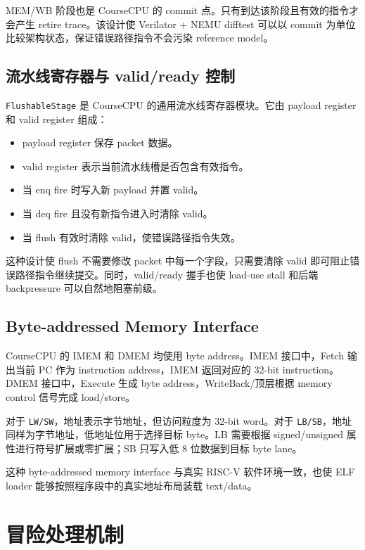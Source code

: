 \documentclass[UTF8,a4paper,12pt]{ctexrep}
\begin{document}
MEM/WB 阶段也是 CourseCPU 的 commit 点。只有到达该阶段且有效的指令才会产生 retire trace。该设计使 Verilator + NEMU difftest 可以以 commit 为单位比较架构状态，保证错误路径指令不会污染 reference model。

\section{流水线寄存器与 valid/ready 控制}

\texttt{FlushableStage} 是 CourseCPU 的通用流水线寄存器模块。它由 payload register 和 valid register 组成：

\begin{itemize}
  \item payload register 保存 packet 数据。
  \item valid register 表示当前流水线槽是否包含有效指令。
  \item 当 enq fire 时写入新 payload 并置 valid。
  \item 当 deq fire 且没有新指令进入时清除 valid。
  \item 当 flush 有效时清除 valid，使错误路径指令失效。
\end{itemize}

这种设计使 flush 不需要修改 packet 中每一个字段，只需要清除 valid 即可阻止错误路径指令继续提交。同时，valid/ready 握手也使 load-use stall 和后端 backpressure 可以自然地阻塞前级。

\section{Byte-addressed Memory Interface}

CourseCPU 的 IMEM 和 DMEM 均使用 byte address。IMEM 接口中，Fetch 输出当前 PC 作为 instruction address，IMEM 返回对应的 32-bit instruction。DMEM 接口中，Execute 生成 byte address，WriteBack/顶层根据 memory control 信号完成 load/store。

对于 \texttt{LW/SW}，地址表示字节地址，但访问粒度为 32-bit word。对于 \texttt{LB/SB}，地址同样为字节地址，低地址位用于选择目标 byte。LB 需要根据 signed/unsigned 属性进行符号扩展或零扩展；SB 只写入低 8 位数据到目标 byte lane。

这种 byte-addressed memory interface 与真实 RISC-V 软件环境一致，也使 ELF loader 能够按照程序段中的真实地址布局装载 text/data。

\chapter{冒险处理机制}
\end{document}
